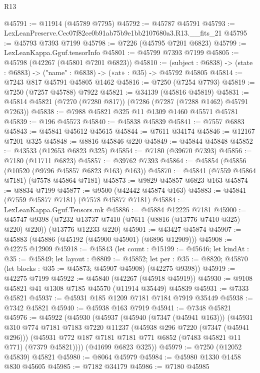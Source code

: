 \begin{lexlean}{R13}
\begin{coremodule}
@45791 := @11914 (@45789 @7795)
@45792 := @45787 @45791
@45793 := LexLeanPreserve.Cec07f82ce0b91ab75b9e1bb2107680a3.R13.__fits_21
@45795 := @45793 @7393 @7199
@45798 := @7226 (@45795 @7201 @6823)
@45799 := LexLeanKappa.Gguf.tensorInfo
@45801 := @45799 @7393 @7199
@45805 := @45798 (@42267 (@45801 @7201 @6823))
@45810 := (subject : @6838) -> (state : @6883) -> ("name" : @6838) -> («at» : @35) -> @45792 @45805
@45814 := @7243 @817 @45791 @45805 @1462
@45816 := @7250 (@7254 @7793)
@45819 := @7250 (@7257 @45788) @7922
@45821 := @34139 (@45816 @45819)
@45831 := @45814 @45821 (@7270 (@7280 @817)) (@7286 (@7287 (@7288 @1462) @45791 @7263))
@45838 := @7988 @45821 @325 @11 @1309 @1460 @45571 @45781
@45839 := @196 @45573
@45840 := @45838 @45839
@45841 := @7557 @6883
@45843 := @45841 @45612 @45615
@45844 := @7611 @34174
@45846 := @12167 @7201 @325
@45848 := @8816 @45846 @220
@45849 := @45844 @45848
@45852 := @43533 (@12653 @6823 @325)
@45854 := @7180 (@39670 @7393)
@45856 := @7180 (@11711 @6823)
@45857 := @39762 @7393
@45864 := @45854 (@45856 (@10520 (@9796 @45857 @6823 @163) @163))
@45870 := @45841 (@7559 @45864 @7181) (@7578 @45864 @7181)
@45873 := @9829 @45857 @6823 @163
@45874 := @8834 @7199
@45877 := @9500 (@42442 @45874 @163)
@45883 := @45841 (@7559 @45877 @7181) (@7578 @45877 @7181)
@45884 := LexLeanKappa.Gguf.Tensors.mk
@45886 := @45884 @12225 @7181
@45900 := @45747
    @9398
    (@7232 @13737 @7410 (@7611 (@8816 (@13776 @7410 @325) @220) @220))
    (@13776 @12233 @220)
@45901 := @43427 @45874
@45907 := @45883 (@45886 (@45192 (@45900 @45901) (@6896 @12909)))
@45908 := @42275 @12909
@45918 := @45843
    (let count : @15199 := @45646;
    let kindAt : @35 := @45849;
    let layout : @8809 := @45852;
    let per : @35 := @8820; @45870 (let blocks : @35 := @45873; @45907 @45908) (@42275 @9398))
@45919 := @42275 @7199
@45922 := @45840 (@42267 (@45918 @45919))
@45930 := @9108 @45821 @41 @1308 @7185 @45570 (@11914 @35449) @45839
@45931 := @7333 @45821
@45937 := @45931 @185 @1209 @7181 @7184 @7919 @35449
@45938 := @7342 @45821
@45940 := @45938 @163 @7919
@45941 := @7348 @45821
@45976 := @45922
    (@45930
      (@45937
        (@45940 (@7347 (@45941 @163)))
        (@45931
          @310
          @774
          @7181
          @7183
          @7220
          @11237
          (@45938 @296 @7220 (@7347 (@45941 @296)))
          (@45931 @772 @187 @7181 @7181 @771 @6852 (@7483 @45821 @11 @771) (@7379 @45821))))
      (@41699 @6823 @325))
@45979 := @7250 (@12052 @45839) @45821
@45980 := @8064 @45979
@45984 := @45980 @1330 @1458 @830 @45605
@45985 := @7182 @34179
@45986 := @7180 @45985

\end{coremodule}
\end{lexlean}
